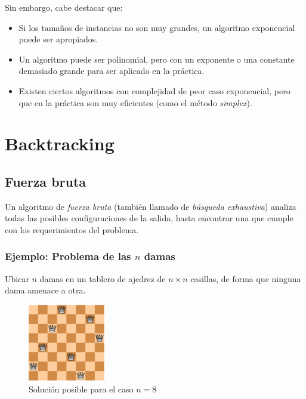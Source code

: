 \documentclass[a4paper]{report}
\begin{document}
Sin embargo, cabe destacar que:
\begin{itemize}
    \item Si los tamaños de instancias no son muy grandes, un algoritmo exponencial puede ser apropiados.
    \item Un algoritmo puede ser polinomial, pero con un exponente o una constante demasiado grande para ser aplicado en la práctica.
    \item Existen ciertos algoritmos con complejidad de peor caso exponencial, pero que en la práctica son muy eficientes (como el método \textit{simplex}).
\end{itemize}

\section{Backtracking}

\subsection{Fuerza bruta}

Un algoritmo de \textit{fuerza bruta} (también llamado de \textit{búsqueda exhaustiva}) analiza todas las posibles configuraciones de la salida, hasta encontrar una que cumple con los requerimientos del problema.

\subsubsection{Ejemplo: Problema de las $n$ damas}

\begin{problema}
    Ubicar $n$ damas en un tablero de ajedrez de $n \times n$ casillas, de forma que ninguna dama amenace a otra.
\end{problema}

\begin{figure}[H]
    \centering
    \includegraphics[width=0.3\textwidth]{solucion_n_damas.png}
    \caption*{Solución posible para el caso $n = 8$}
\end{figure}
\end{document}
